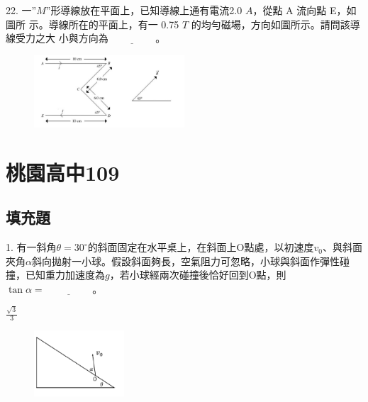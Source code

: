 \documentclass[cn,10pt,math=newtx,chinesefont=founder,device=ig]{elegantbook}
\begin{document}
\begin{example}
   22. 一$”M”$形導線放在平面上，已知導線上通有電流2.0 $A$，從點 A 流向點 E，如圖所
示。導線所在的平面上，有一 0.75 $T$ 的均勻磁場，方向如圖所示。請問該導線受力之大
小與方向為$\underline{\hspace{2cm}}$。\\
    \rightline{[桃園聯招教甄109]}
\end{example}
\begin{solution}
    
\end{solution}
\begin{figure}[htbp]
    \flushright
    \includegraphics[width=0.5\textwidth]{image/109桃聯22.png}
  \end{figure}
\newpage


\chapter{桃園高中109}
\section{填充題}


\begin{example}
   1. 有一斜角$\theta=30^\circ$的斜面固定在水平桌上，在斜面上O點處，以初速度$v_0$、與斜面夾角$\alpha$斜向拋射一小球。假設斜面夠長，空氣阻力可忽略，小球與斜面作彈性碰撞，已知重力加速度為$g$，若小球經兩次碰撞後恰好回到O點，則$\tan{\alpha} = \underline{\hspace{2cm}}$。\\
    \rightline{[桃園高中教甄109]}
\end{example}
\begin{solution}
    $\frac{\sqrt{3}}{3}$
\end{solution}
\begin{figure}[htbp]
    \flushright
    \includegraphics[width=0.3\textwidth]{image/109桃園1.png}
  \end{figure}
\newpage
\end{document}
